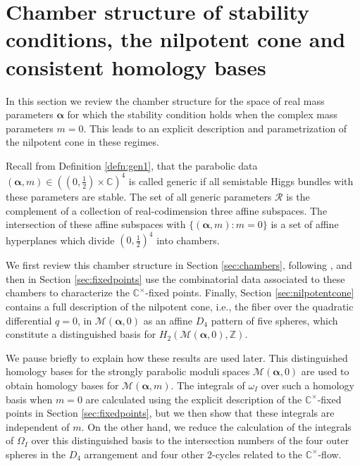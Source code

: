 \documentclass[12pt,letterpaper,reqno]{amsart}
\def\mathbf#1{#1}%
\theoremstyle{remark}
\theoremstyle{definition}
\numberwithin{thm}{section}
\numberwithin{equation}{section}
\numberwithin{figure}{section}
\newcommand{\C}{\ensuremath{\mathbb C}}
\newcommand{\Z}{\ensuremath{\mathbb Z}}
\newcommand{\bsa}{\boldsymbol{\alpha}}
\newcommand{\bfm}{\mathbf{m}}
\begin{document}
\section{Chamber structure of stability conditions, the nilpotent cone and consistent homology bases}\label{sec:distinguished_basis}
In this section we review the chamber structure for the space of real mass parameters $\bsa$ for which the stability condition holds when the complex mass 
parameters $\bfm = \mathbf{0}$. This leads to an explicit description and parametrization of the nilpotent cone in these regimes. 

Recall from Definition \ref{defn:gen1}, that the parabolic data $(\bsa, \bfm) \in ((0, \tfrac{1}{2}) \times \C)^4$ is called generic if all semistable Higgs bundles with
these parameters are stable. The set of all generic parameters $\mathcal{R}$ is the complement of a collection of real-codimension three affine subspaces. 
The intersection of these affine subspaces with $\{(\bsa,\bfm): \bfm = \mathbf{0}\}$ is a set of affine hyperplanes which divide $(0,\tfrac12)^4$ into chambers. 

We first review this chamber structure in Section \ref{sec:chambers}, following \cite{Meneses}, and then in Section \ref{sec:fixedpoints} use the combinatorial 
data associated to these chambers to characterize the $\C^\times$-fixed points. Finally, Section \ref{sec:nilpotentcone} contains a full description of the nilpotent cone, 
i.e., the fiber over the quadratic differential $q=0$, in $\mathcal{M}(\bsa, \mathbf{0})$ as an affine $D_4$ pattern of five spheres, which
constitute a distinguished basis for $H_2(\mathcal{M}(\boldsymbol{\alpha}, \mathbf{0}), \Z)$.

\medskip

We pause briefly to explain how these results are used later.   This distinguished homology bases for the strongly parabolic moduli spaces $\mathcal{M}(\bsa, \mathbf{0})$ 
are used to obtain homology bases for $\mathcal{M}(\boldsymbol{\alpha}, \mathbf{m})$. The integrals of $\omega_I$ over such a homology basis
when $\bfm = \mathbf{0}$ are calculated using the explicit description of the $\C^\times$-fixed points in Section \ref{sec:fixedpoints}, but we then show that these 
integrals are independent of $\mathbf{m}$. On the other hand, we reduce the calculation of the integrals of $\Omega_I$ over this distinguished basis 
to the intersection numbers of the four outer spheres in the $D_4$ arrangement  and four other $2$-cycles related to the $\C^\times$-flow.
\end{document}
